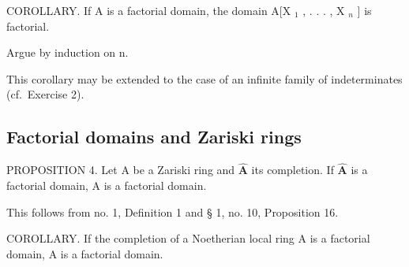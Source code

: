 COROLLARY. If A is a factorial domain, the domain A{[}X \(_{1}\) , . . . , X \(_{n}\) {]} is factorial.

Argue by induction on n.

This corollary may be extended to the case of an infinite family of indeterminates (cf.~Exercise 2).

\subsection{Factorial domains and Zariski rings}

PROPOSITION 4. Let A be a Zariski ring and \(\hat{\mathbf{A}}\) its completion. If \(\hat{\mathbf{A}}\) is a factorial domain, A is a factorial domain.

This follows from no. 1, Definition 1 and § 1, no. 10, Proposition 16.

COROLLARY. If the completion of a Noetherian local ring A is a factorial domain, A is a factorial domain.

